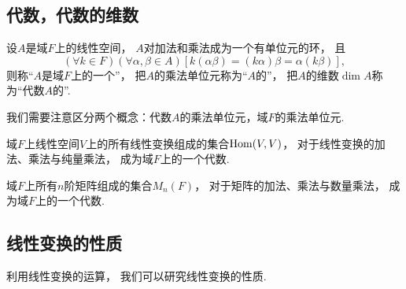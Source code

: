 \subsection{代数，代数的维数}
\begin{definition}
设\(A\)是域\(F\)上的线性空间，
\(A\)对加法和乘法成为一个有单位元的环，
且\begin{equation*}
	(\forall k\in F)
	(\forall\alpha,\beta\in A)
	[
		k(\alpha\beta)
		=(k\alpha)\beta
		=\alpha(k\beta)
	],
\end{equation*}
则称“\(A\)是域\(F\)上的一个”，
把\(A\)的乘法单位元称为“\(A\)的”，
把\(A\)的维数\(\dim A\)称为“代数\(A\)的”.
\end{definition}
\begin{remark}
我们需要注意区分两个概念：代数\(A\)的乘法单位元，域\(F\)的乘法单位元.
\end{remark}

\begin{example}
域\(F\)上线性空间\(V\)上的所有线性变换组成的集合\(\operatorname{Hom}(V,V)\)，
对于线性变换的加法、乘法与纯量乘法，
成为域\(F\)上的一个代数.
\end{example}

\begin{example}
域\(F\)上所有\(n\)阶矩阵组成的集合\(M_n(F)\)，
对于矩阵的加法、乘法与数量乘法，
成为域\(F\)上的一个代数.
\end{example}

\subsection{线性变换的性质}
利用线性变换的运算，
我们可以研究线性变换的性质.

